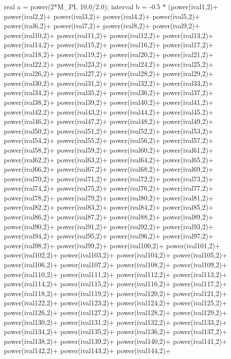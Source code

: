 \begin{DoxyCode}
{
  real a = power(2*M_PI, 10.0/2.0);
   interval b = -0.5 * (power(ival1,2)+
power(ival2,2)+
power(ival3,2)+
power(ival4,2)+
power(ival5,2)+
power(ival6,2)+
power(ival7,2)+
power(ival8,2)+
power(ival9,2)+
power(ival10,2)+
power(ival11,2)+
power(ival12,2)+
power(ival13,2)+
power(ival14,2)+
power(ival15,2)+
power(ival16,2)+
power(ival17,2)+
power(ival18,2)+
power(ival19,2)+
power(ival20,2)+
power(ival21,2)+
power(ival22,2)+
power(ival23,2)+
power(ival24,2)+
power(ival25,2)+
power(ival26,2)+
power(ival27,2)+
power(ival28,2)+
power(ival29,2)+
power(ival30,2)+
power(ival31,2)+
power(ival32,2)+
power(ival33,2)+
power(ival34,2)+
power(ival35,2)+
power(ival36,2)+
power(ival37,2)+
power(ival38,2)+
power(ival39,2)+
power(ival40,2)+
power(ival41,2)+
power(ival42,2)+
power(ival43,2)+
power(ival44,2)+
power(ival45,2)+
power(ival46,2)+
power(ival47,2)+
power(ival48,2)+
power(ival49,2)+
power(ival50,2)+
power(ival51,2)+
power(ival52,2)+
power(ival53,2)+
power(ival54,2)+
power(ival55,2)+
power(ival56,2)+
power(ival57,2)+
power(ival58,2)+
power(ival59,2)+
power(ival60,2)+
power(ival61,2)+
power(ival62,2)+
power(ival63,2)+
power(ival64,2)+
power(ival65,2)+
power(ival66,2)+
power(ival67,2)+
power(ival68,2)+
power(ival69,2)+
power(ival70,2)+
power(ival71,2)+
power(ival72,2)+
power(ival73,2)+
power(ival74,2)+
power(ival75,2)+
power(ival76,2)+
power(ival77,2)+
power(ival78,2)+
power(ival79,2)+
power(ival80,2)+
power(ival81,2)+
power(ival82,2)+
power(ival83,2)+
power(ival84,2)+
power(ival85,2)+
power(ival86,2)+
power(ival87,2)+
power(ival88,2)+
power(ival89,2)+
power(ival90,2)+
power(ival91,2)+
power(ival92,2)+
power(ival93,2)+
power(ival94,2)+
power(ival95,2)+
power(ival96,2)+
power(ival97,2)+
power(ival98,2)+
power(ival99,2)+
power(ival100,2)+
power(ival101,2)+
power(ival102,2)+
power(ival103,2)+
power(ival104,2)+
power(ival105,2)+
power(ival106,2)+
power(ival107,2)+
power(ival108,2)+
power(ival109,2)+
power(ival110,2)+
power(ival111,2)+
power(ival112,2)+
power(ival113,2)+
power(ival114,2)+
power(ival115,2)+
power(ival116,2)+
power(ival117,2)+
power(ival118,2)+
power(ival119,2)+
power(ival120,2)+
power(ival121,2)+
power(ival122,2)+
power(ival123,2)+
power(ival124,2)+
power(ival125,2)+
power(ival126,2)+
power(ival127,2)+
power(ival128,2)+
power(ival129,2)+
power(ival130,2)+
power(ival131,2)+
power(ival132,2)+
power(ival133,2)+
power(ival134,2)+
power(ival135,2)+
power(ival136,2)+
power(ival137,2)+
power(ival138,2)+
power(ival139,2)+
power(ival140,2)+
power(ival141,2)+
power(ival142,2)+
power(ival143,2)+
power(ival144,2)+
}
\end{DoxyCode}
